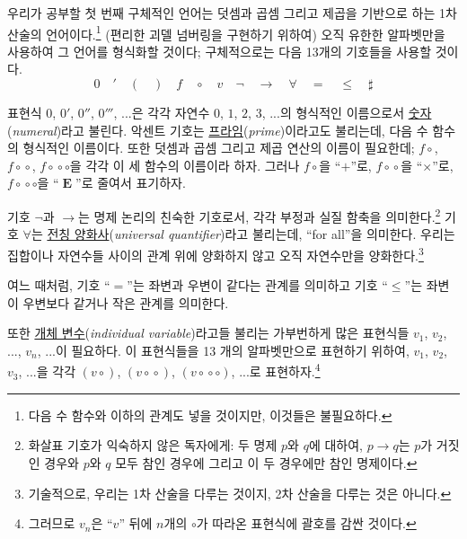 \documentclass[12pt]{paper}
\begin{document}
우리가 공부할 첫 번째 구체적인 언어는 덧셈과 곱셈 그리고 제곱을 기반으로 하는 1차 산술의 언어이다.\footnote
{
다음 수 함수와 이하의 관계도 넣을 것이지만, 이것들은 불필요하다.
}
(편리한 괴델 넘버링을 구현하기 위하여) 오직 유한한 알파벳만을 사용하여 그 언어를 형식화할 것이다;
구체적으로는 다음 13개의 기호들을 사용할 것이다.
$$ 0 \quad ' \quad \left( \quad \right) \quad f \quad \circ \quad v \quad \lnot \quad \rightarrow \quad \forall \quad = \quad \le \quad \sharp $$

표현식 $0$, $0'$, $0''$, $0'''$, ...은
각각 자연수 $0$, $1$, $2$, $3$, ...의 형식적인 이름으로서 \underline{숫자}(\textit{numeral})라고 불린다.
악센트 기호는 \underline{프라임}(\textit{prime})이라고도 불리는데,
다음 수 함수의 형식적인 이름이다.
또한 덧셈과 곱셈 그리고 제곱 연산의 이름이 필요한데;
$f \circ$, $f \! \circ \! \circ$, $f \! \circ \! \circ \circ$을 각각 이 세 함수의 이름이라 하자.
그러나 $f \circ$을 ``$+$''로, $f \! \circ \! \circ$을 ``$\times$''로, $f \! \circ \! \circ \circ$을 ``$\mathop{\mathbf{E}}$''로 줄여서 표기하자.

기호 $\lnot$과 $\rightarrow$는 명제 논리의 친숙한 기호로서,
각각 부정과 실질 함축을 의미한다.\footnote
{
화살표 기호가 익숙하지 않은 독자에게: 두 명제 $p$와 $q$에 대하여, $p \rightarrow q$는 $p$가 거짓인 경우와 $p$와 $q$ 모두 참인 경우에 그리고 이 두 경우에만 참인 명제이다.
}
기호 $\forall$는 \underline{전칭 양화사}(\textit{universal quantifier})라고 불리는데, ``for all''을 의미한다.
우리는 집합이나 자연수들 사이의 관계 위에 양화하지 않고 오직 자연수만을 양화한다.\footnote
{
기술적으로, 우리는 1차 산술을 다루는 것이지, 2차 산술을 다루는 것은 아니다.
}

여느 때처럼, 기호 ``$=$''는 좌변과 우변이 같다는 관계를 의미하고 기호 ``$\leq$''는 좌변이 우변보다 같거나 작은 관계를 의미한다.

또한 \underline{개체 변수}(\textit{individual variable})라고들 불리는 가부번하게 많은 표현식들 $v_{1}$, $v_{2}$, ..., $v_{n}$, ...이 필요하다.
이 표현식들을 13 개의 알파벳만으로 표현하기 위하여, $v_{1}$, $v_{2}$, $v_{3}$, ...을 각각 $\left( v \circ \right)$, $\left( v \! \circ \! \circ \right)$, $\left( v \! \circ \! \circ \circ \right)$, ...로 표현하자.\footnote
{
그러므로 $v_{n}$은 ``$v$'' 뒤에 $n$개의 $\circ$가 따라온 표현식에 괄호를 감싼 것이다.
}
\end{document}
